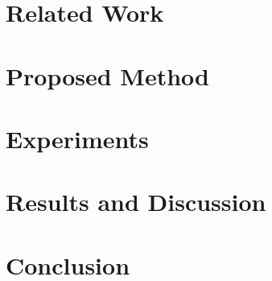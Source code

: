 \documentclass[twocolumn]{svjour3}
\begin{document}
\section{Related Work}\label{sec:related_work}

\section{Proposed Method}\label{sec:method}

\section{Experiments}\label{sec:experiments}

\section{Results and Discussion}\label{sec:results}

\section{Conclusion}\label{sec:conclusion}




\begingroup
\raggedright

\endgroup
\end{document}
